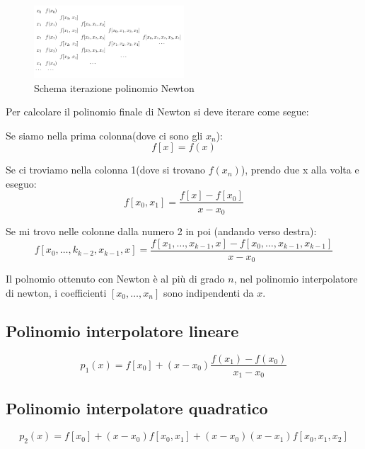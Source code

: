 \begin{figure}[h!]
  \begin{center}
    \includegraphics[width=0.5\textwidth]{./images/newton.png}
  \end{center}
  \caption{Schema iterazione polinomio Newton}
  \label{fig:iterazione_newton}
\end{figure}


Per calcolare il polinomio finale di Newton si deve iterare come segue:

Se siamo nella prima colonna(dove ci sono gli $x_n$):
\begin{equation}
  f[x] = f(x)
\end{equation}

Se ci troviamo nella colonna 1(dove si trovano $f(x_n)$), prendo due x alla volta e eseguo:
\begin{equation}
  f[x_0, x_1] = \displaystyle\frac{f[x] - f[x_0]}{x - x_0}
\end{equation}

Se mi trovo nelle colonne dalla numero 2 in poi (andando verso destra):
\begin{equation}
  f[x_0, \dots, k_{k-2}, x_{k-1}, x] = \displaystyle\frac{f[x_1, \dots, x_{k-1}, x] - f[x_0, \dots, x_{k-1}, x_{k-1}]}{x - x_0}
\end{equation}

Il polnomio ottenuto con Newton è al più di grado $n$, nel polinomio interpolatore di newton, i coefficienti $[x_0, \dots, x_n]$ sono indipendenti da $x$.

\subsection{Polinomio interpolatore lineare}
\begin{equation}
  p_1(x) = f[x_0] + (x - x_0) \displaystyle\frac{f(x_1) - f(x_0)}{x_1 - x_0}
\end{equation}

\subsection{Polinomio interpolatore quadratico}
\begin{equation}
  p_2(x) = f[x_0] + (x - x_0) f[x_0, x_1] + (x - x_0)(x - x_1) f[x_0, x_1, x_2]
\end{equation}


